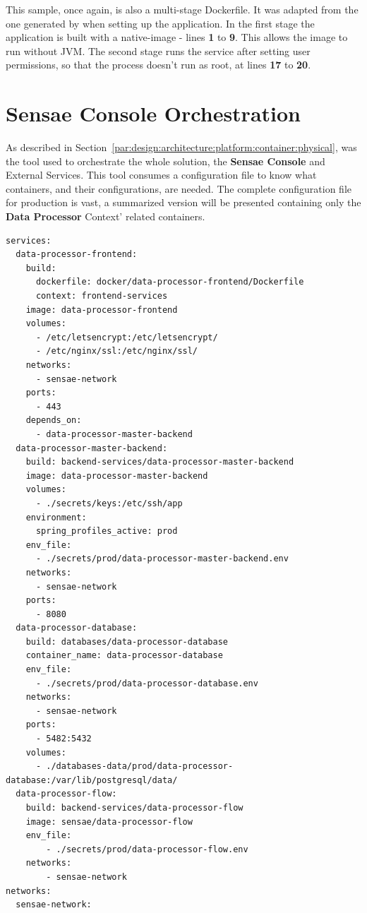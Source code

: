 This sample, once again, is also a multi-stage Dockerfile. It was adapted from the one generated by  when setting up the application. In the first stage the application is built with a  native-image - lines \textbf{1} to \textbf{9}. This allows the image to run without \gls{JVM}. The second stage runs the service after setting user permissions, so that the process doesn't run as root, at lines \textbf{17} to \textbf{20}.

\section{Sensae Console Orchestration}
\label{subsec:implementation:description:compose}

As described in Section~\ref{par:design:architecture:platform:container:physical},  was the tool used to orchestrate the whole solution, the \textbf{Sensae Console} and External Services. This tool consumes a configuration file to know what containers, and their configurations, are needed. The complete configuration file for production is vast, a summarized version will be presented containing only the \textbf{Data Processor} Context' related containers.

\begin{lstlisting}[style=yaml, caption=Docker Compose Configuration File for Production, label={code:implementation:description:compose:file}]
services:
  data-processor-frontend:
    build:
      dockerfile: docker/data-processor-frontend/Dockerfile
      context: frontend-services
    image: data-processor-frontend
    volumes:
      - /etc/letsencrypt:/etc/letsencrypt/
      - /etc/nginx/ssl:/etc/nginx/ssl/
    networks:
      - sensae-network
    ports:
      - 443
    depends_on:
      - data-processor-master-backend
  data-processor-master-backend:
    build: backend-services/data-processor-master-backend
    image: data-processor-master-backend
    volumes:
      - ./secrets/keys:/etc/ssh/app
    environment:
      spring_profiles_active: prod
    env_file:
      - ./secrets/prod/data-processor-master-backend.env
    networks:
      - sensae-network
    ports:
      - 8080
  data-processor-database:
    build: databases/data-processor-database
    container_name: data-processor-database
    env_file:
      - ./secrets/prod/data-processor-database.env
    networks:
      - sensae-network
    ports:
      - 5482:5432
    volumes:
      - ./databases-data/prod/data-processor-database:/var/lib/postgresql/data/
  data-processor-flow:
    build: backend-services/data-processor-flow
    image: sensae/data-processor-flow
    env_file:
        - ./secrets/prod/data-processor-flow.env
    networks:
        - sensae-network
networks:
  sensae-network:
\end{lstlisting}

